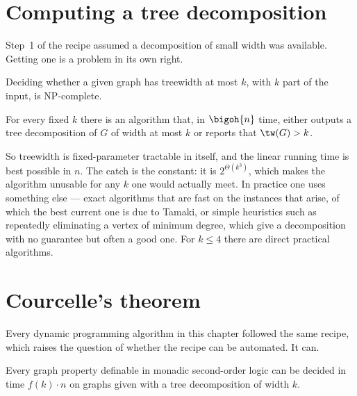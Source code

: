 \section{Computing a tree decomposition}
\label{sec:computing-treewidth}

Step~1 of the recipe assumed a decomposition of small width was available.
Getting one is a problem in its own right.

\begin{theorem}\label{thm:treewidth-npc}
Deciding whether a given graph has treewidth at most $k$, with $k$ part of the
input, is \textrm{NP}-complete.
\end{theorem}

\begin{theorem}\label{thm:bodlaender}
For every fixed $k$ there is an algorithm that, in $\bigoh{n}$ time, either
outputs a tree decomposition of $G$ of width at most $k$ or reports that
$\tw(G) > k$.
\end{theorem}

So treewidth is fixed-parameter tractable in itself, and the linear running
time is best possible in $n$. The catch is the constant: it is
$2^{\Theta(k^3)}$, which makes the algorithm unusable for any $k$ one would
actually meet. In practice one uses something else --- exact algorithms that are
fast on the instances that arise, of which the best current one is due to
Tamaki, or simple heuristics such as repeatedly eliminating a vertex of minimum
degree, which give a decomposition with no guarantee but often a good one. For
$k \le 4$ there are direct practical algorithms.

\section{Courcelle's theorem}
\label{sec:courcelle}

Every dynamic programming algorithm in this chapter followed the same recipe,
which raises the question of whether the recipe can be automated. It can.

\begin{theorem}\label{thm:courcelle}
Every graph property definable in monadic second-order logic can be decided in
time $f(k) \cdot n$ on graphs given with a tree decomposition of width $k$.
\end{theorem}

